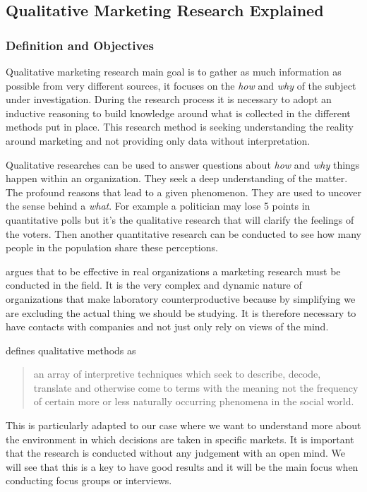 \documentclass[10pt]{report}
\begin{document}
\subsection{Qualitative Marketing Research Explained}

\subsubsection{Definition and Objectives}
Qualitative marketing research main goal is to gather as much information as possible from very different sources, it focuses on the \emph{how} and \emph{why} of the subject under investigation. During the research process it is necessary to adopt an inductive reasoning to build knowledge around what is collected in the different methods put in place. This research method is seeking understanding the reality around marketing and not providing only data without interpretation. \autocite{carson2001}

Qualitative researches can be used to answer questions about \emph{how} and \emph{why} things happen within an organization. They seek a deep understanding of the matter. The profound reasons that lead to a given phenomenon. They are used to uncover the sense behind a \emph{what}. For example a politician may lose 5 points in quantitative polls but it's the qualitative research that will clarify the feelings of the voters. Then another quantitative research can be conducted to see how many people in the population share these perceptions.

\autocite{mintzberg1979} argues that to be effective in real organizations a marketing research must be conducted in the field. It is the very complex and dynamic nature of organizations that make laboratory counterproductive because by simplifying we are excluding the actual thing we should be studying. It is therefore necessary to have contacts with companies and not just only rely on views of the mind.

\autocite{van1979reclaiming} defines qualitative methods as 
\begin{quote}
an array of interpretive techniques which seek to describe, decode, translate and otherwise come to terms with the meaning not the frequency of certain more or less naturally occurring phenomena in the social world.
\end{quote}
This is particularly adapted to our case where we want to understand more about the environment in which decisions are taken in specific markets. It is important that the research is conducted without any judgement with an open mind. We will see that this is a key to have good results and it will be the main focus when conducting focus groups or interviews.
\end{document}
